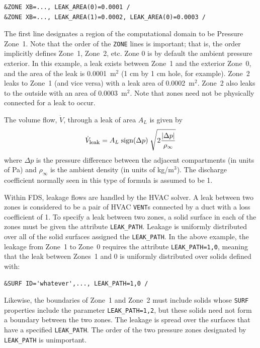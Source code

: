 \documentclass[11pt]{book}
\newcommand{\ct}{\tt\small}
\newcommand{\be}{\begin{equation}}
\newcommand{\ee}{\end{equation}}
\begin{document}
\footnotesize
\begin{verbatim}
&ZONE XB=..., LEAK_AREA(0)=0.0001 /
&ZONE XB=..., LEAK_AREA(1)=0.0002, LEAK_AREA(0)=0.0003 /
\end{verbatim}
\normalsize

\noindent
The first line designates a region of the computational domain to be Pressure Zone~1. Note that the order of the {\ct ZONE} lines is important; that is, the order
implicitly defines Zone~1, Zone~2, etc.
Zone 0 is by default the ambient pressure exterior. In this example, a leak exists between Zone~1 and the exterior Zone~0, and the area of the leak
is 0.0001~m$^2$ (1 cm by 1 cm hole, for example). Zone~2 leaks to Zone~1 (and vice versa)
with a leak area of 0.0002~m$^2$. Zone~2 also leaks to the outside with an area of 0.0003~m$^2$. Note that zones need not be physically connected for a leak to occur.

The volume flow, $\dot{V}$, through a leak of area $A_L$ is given by
\be  \dot{V}_{\hbox{\footnotesize leak}} = A_L \; \hbox{sign} (\Delta p) \; \sqrt{2 \frac{ | \Delta p |}{\rho_\infty}} \ee
where $\Delta p$ is the pressure difference between the adjacent compartments (in units of Pa) and
$\rho_\infty$ is the ambient density (in units of kg/m$^3$). The discharge coefficient normally seen in this type of formula is assumed
to be 1.

Within FDS, leakage flows are handled by the HVAC solver.  A leak between two zones is considered to be a pair of HVAC {\ct VENT}s connected by a duct with a loss coefficient of 1.  To specify a leak between two zones, a solid surface in each of the zones must be given the attribute {\ct LEAK\_PATH}.  Leakage is uniformly distributed over all of the solid surfaces assigned the {\ct LEAK\_PATH}.  In the above example, the leakage from Zone~1 to Zone~0 requires the attribute
{\ct LEAK\_PATH=1,0}, meaning that the leak between Zones~1 and 0 is uniformly distributed
over solids defined with:

\footnotesize
\begin{verbatim}
&SURF ID='whatever',..., LEAK_PATH=1,0 /
\end{verbatim}
\normalsize

\noindent
Likewise, the boundaries of Zone~1 and Zone~2 must include solids whose {\ct SURF} properties include the parameter {\ct LEAK\_PATH=1,2}, but these solids need not form a boundary between the two zones. The leakage is spread over the surfaces that have a specified {\ct LEAK\_PATH}. The order of the two pressure zones designated by {\ct LEAK\_PATH} is unimportant.
\end{document}
